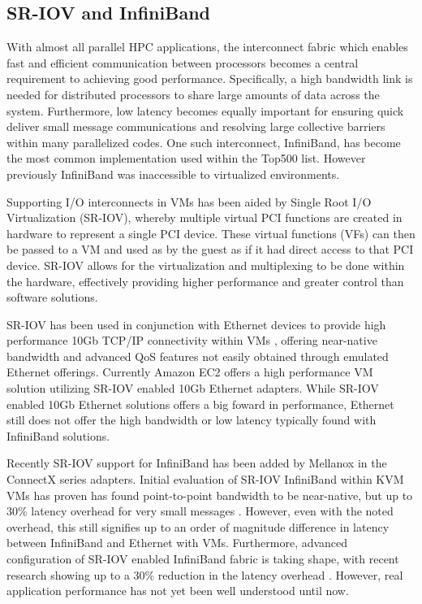 \documentclass{sigplanconf}
\begin{document}
\subsection{SR-IOV and InfiniBand}

With almost all parallel HPC applications, the interconnect fabric which enables fast and efficient communication between processors becomes a central requirement to achieving good performance. Specifically, a high bandwidth link is needed for distributed processors to share large amounts of data across the system. Furthermore, low latency becomes equally important for ensuring quick deliver small message communications and resolving large collective barriers within many parallelized codes. One such interconnect, InfiniBand, has become the most common implementation used within the Top500 list. However previously InfiniBand was inaccessible to virtualized environments.  

Supporting I/O interconnects in VMs has been aided by Single Root I/O Virtualization (SR-IOV), whereby multiple virtual PCI functions are created in hardware to represent a single PCI device. These virtual functions (VFs) can then be passed to a VM and used as by the guest as if it had direct access to that PCI device. SR-IOV allows for the virtualization and multiplexing to be done within the hardware, effectively providing higher performance and greater control than software solutions. 

SR-IOV has been used in conjunction with Ethernet devices to provide high performance 10Gb TCP/IP connectivity within VMs \cite{Liu2010}, offering near-native bandwidth and advanced QoS features not easily obtained through emulated Ethernet offerings. Currently Amazon EC2 offers a high performance VM solution utilizing SR-IOV enabled 10Gb Ethernet adapters. While SR-IOV enabled 10Gb Ethernet solutions offers a big foward in performance, Ethernet still does not offer the high bandwidth or low latency typically found with InfiniBand solutions. 

Recently SR-IOV support for InfiniBand has been added by Mellanox in the ConnectX series adapters. Initial evaluation of SR-IOV InfiniBand within KVM VMs has proven has found point-to-point bandwidth to be near-native, but up to 30\% latency overhead for very small messages \cite{jose2013sr, RuivoAGTKNR14}. However, even with the noted overhead, this still signifies up to an order of magnitude difference in latency between InfiniBand and Ethernet with VMs. Furthermore, advanced configuration of SR-IOV enabled InfiniBand fabric is taking shape, with recent research showing up to a 30\% reduction in the latency overhead \cite{Musleh2014cloud}. However, real application performance has not yet been well understood until now. 
\end{document}
